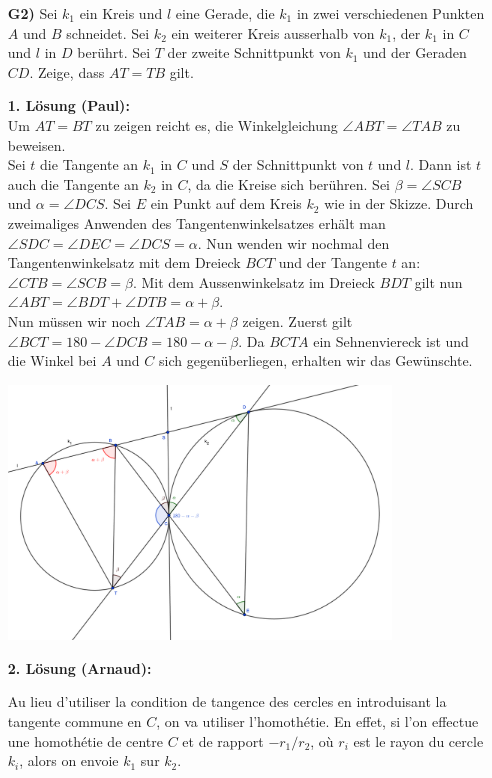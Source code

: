 \documentclass[language=german,style=solution]{smo}
\begin{document}
\begin{enumerate}
\newpage

\item[\textbf{G2)}]
Sei $k_1$ ein Kreis und $l$ eine Gerade, die $k_1$ in zwei verschiedenen Punkten $A$ und $B$ schneidet. Sei $k_2$ ein weiterer Kreis ausserhalb von $k_1$, der $k_1$ in $C$ und $l$ in $D$ berührt. Sei $T$ der zweite Schnittpunkt von $k_1$ und der Geraden $CD$. Zeige, dass $AT=TB$ gilt.

\textbf{1. Lösung (Paul):}\\
Um $AT=BT$ zu zeigen reicht es, die Winkelgleichung $\angle ABT = \angle TAB$ zu beweisen.\\
Sei $t$ die Tangente an $k_1$ in $C$ und $S$ der Schnittpunkt von $t$ und $l$. Dann ist $t$ auch die Tangente an $k_2$ in $C$, da die Kreise sich berühren. Sei $\beta = \angle SCB$ und $\alpha = \angle DCS$. Sei $E$ ein Punkt auf dem Kreis $k_2$ wie in der Skizze. Durch zweimaliges Anwenden des Tangentenwinkelsatzes erhält man $\angle SDC = \angle DEC = \angle DCS = \alpha$. Nun wenden wir nochmal den Tangentenwinkelsatz mit dem Dreieck $BCT$ und der Tangente $t$ an: $\angle CTB = \angle SCB = \beta$. Mit dem Aussenwinkelsatz im Dreieck $BDT$ gilt nun $\angle ABT = \angle BDT + \angle DTB = \alpha + \beta$. \\
Nun müssen wir noch $\angle TAB = \alpha + \beta$ zeigen.  Zuerst gilt $\angle BCT = 180-\angle DCB = 180 - \alpha - \beta$. Da $BCTA$ ein Sehnenviereck ist und die Winkel bei $A$ und $C$ sich gegenüberliegen, erhalten wir das Gewünschte.

\begin{center}
\includegraphics[width=0.8\textwidth]{muloe_G2.pdf}
\end{center}

\textbf{2. Lösung (Arnaud):}

Au lieu d'utiliser la condition de tangence des cercles en introduisant la tangente commune en $C$, on va utiliser l'homothétie. En effet, si l'on effectue une homothétie de centre $C$ et de rapport $-r_1/r_2$, où $r_i$ est le rayon du cercle $k_i$, alors on envoie $k_1$ sur $k_2$.


\end{enumerate}
\end{document}
